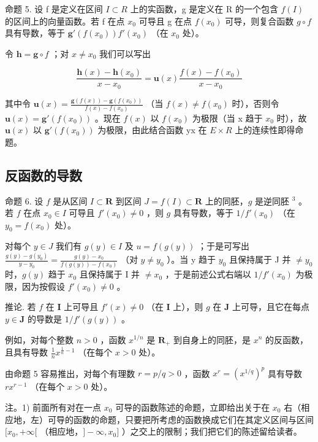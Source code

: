 命题 5. 设 f 是定义在区间 \(I \subset R\) 上的实函数，g 是定义在 R 的一个包含 \(f(I)\) 的区间上的向量函数。若 f 在点 \(x_{0}\) 可导且 g 在点 \(f(x_{0})\) 可导，则复合函数 \(g \circ f\) 具有导数，等于 \(\mathbf{g}'(f(x_{0}))f'(x_{0})\) （在 \(x_{0}\) 处）。

令 \(\mathbf{h} = \mathbf{g} \circ f\) ；对 \(x \neq x_0\) 我们可以写出

\[
\frac {\mathbf {h} (x) - \mathbf {h} (x _ {0})}{x - x _ {0}} = \mathbf {u} (x) \frac {f (x) - f (x _ {0})}{x - x _ {0}}
\]

其中令 \(\mathbf{u}(x)=\frac{\mathbf{g}(f(x))-\mathbf{g}(f(x_{0}))}{f(x)-f(x_{0})}\) （当 \(f(x)\neq f(x_{0})\) 时），否则令 \(\mathbf{u}(x)=\mathbf{g}'(f(x_{0}))\) 。现在 \(f(x)\) 以 \(f(x_{0})\) 为极限（当 x 趋于 \(x_{0}\) 时），故 \(\mathbf{u}(x)\) 以 \(\mathbf{g}'(f(x_{0}))\) 为极限，由此结合函数 yx 在 \(E\times R\) 上的连续性即得命题。

\subsection{反函数的导数}

命题 6. 设 \(f\) 是从区间 \(I \subset \mathbf{R}\) 到区间 \(J = f(I) \subset \mathbf{R}\) 上的同胚，\(g\) 是逆同胚 \(^3\) 。若 \(f\) 在点 \(x_0 \in I\) 可导且 \(f'(x_0) \neq 0\) ，则 \(g\) 具有导数，等于 \(1/f'(x_0)\) （在 \(y_0 = f(x_0)\) 处）。

对每个 \(y \in J\) 我们有 \(g(y) \in I\) 及 \(u = f(g(y))\) ；于是可写出 \(\frac{g(y) - g(y_0)}{y - y_0} = \frac{g(y) - x_0}{f(g(y)) - f(x_0)}\) （对 \(y \neq y_0\) ）。当 y 趋于 \(y_0\) 且保持属于 J 并 \(\neq y_0\) 时，\(g(y)\) 趋于 \(x_0\) 且保持属于 I 并 \(\neq x_0\) ，于是前述公式右端以 \(1/f'(x_0)\) 为极限，因为按假设 \(f'(x_0) \neq 0\) 。

推论. 若 \(f\) 在 \(\mathbf{I}\) 上可导且 \(f'(x) \neq 0\) （在 \(\mathbf{I}\) 上），则 \(g\) 在 \(\mathbf{J}\) 上可导，且它在每点 \(y \in \mathbf{J}\) 的导数是 \(1 / f'(g(y))\) 。

例如，对每个整数 \(n > 0\) ，函数 \(x^{1 / n}\) 是 \(\mathbf{R}_+\) 到自身上的同胚，是 \(x^n\) 的反函数，且具有导数 \(\frac{1}{n} x^{\frac{1}{n} - 1}\) （在每个 \(x > 0\) 处）。

由命题 5 容易推出，对每个有理数 \(r = p / q > 0\) ，函数 \(x^{r} = (x^{1 / q})^{p}\) 具有导数 \(rx^{r - 1}\) （在每个 \(x > 0\) 处）。

注。1) 前面所有对在一点 \(x_0\) 可导的函数陈述的命题，立即给出关于在 \(x_0\) 右（相应地，左）可导的函数的命题，只要把所考虑的函数换成它们在其定义区间与区间 \([x_0, +\infty[\) （相应地，\(] - \infty, x_0]\) ）之交上的限制；我们把它们的陈述留给读者。

